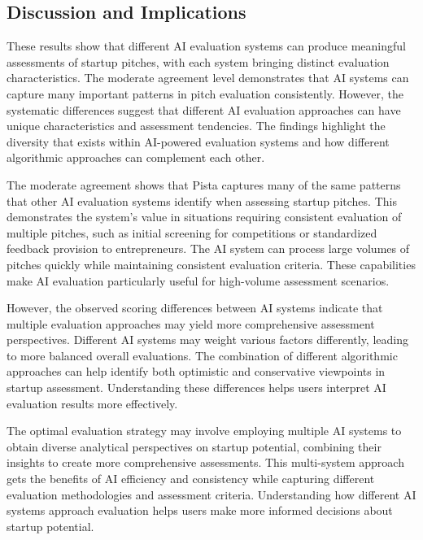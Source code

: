 \subsection{Discussion and Implications}

These results show that different AI evaluation systems can produce meaningful assessments of startup pitches, with each system bringing distinct evaluation characteristics. The moderate agreement level demonstrates that AI systems can capture many important patterns in pitch evaluation consistently. However, the systematic differences suggest that different AI evaluation approaches can have unique characteristics and assessment tendencies. The findings highlight the diversity that exists within AI-powered evaluation systems and how different algorithmic approaches can complement each other.

The moderate agreement shows that Pista captures many of the same patterns that other AI evaluation systems identify when assessing startup pitches. This demonstrates the system's value in situations requiring consistent evaluation of multiple pitches, such as initial screening for competitions or standardized feedback provision to entrepreneurs. The AI system can process large volumes of pitches quickly while maintaining consistent evaluation criteria. These capabilities make AI evaluation particularly useful for high-volume assessment scenarios.

However, the observed scoring differences between AI systems indicate that multiple evaluation approaches may yield more comprehensive assessment perspectives. Different AI systems may weight various factors differently, leading to more balanced overall evaluations. The combination of different algorithmic approaches can help identify both optimistic and conservative viewpoints in startup assessment. Understanding these differences helps users interpret AI evaluation results more effectively.

The optimal evaluation strategy may involve employing multiple AI systems to obtain diverse analytical perspectives on startup potential, combining their insights to create more comprehensive assessments. This multi-system approach gets the benefits of AI efficiency and consistency while capturing different evaluation methodologies and assessment criteria. Understanding how different AI systems approach evaluation helps users make more informed decisions about startup potential.
